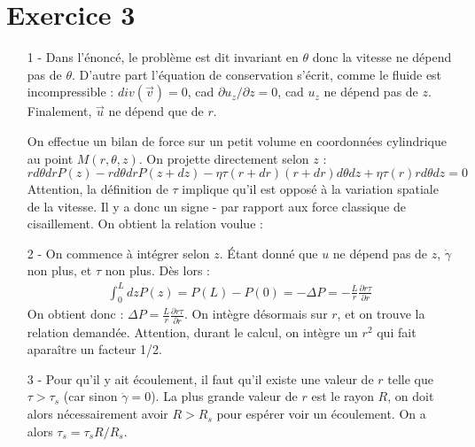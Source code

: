 \documentclass{report}
\begin{document}
\section*{Exercice 3}

\begin{itemize}
	\item[1 - ] Dans l'énoncé, le problème est dit invariant en $\theta$ donc la vitesse ne dépend pas de $\theta$. D'autre part l'équation de conservation s'écrit, comme le fluide est incompressible : $div(\vec{v})=0$, cad $\partial u_z/\partial z=0$, cad $u_z$ ne dépend pas de $z$. Finalement, $\vec{u}$ ne dépend que de $r$.
	
	On effectue un bilan de force sur un petit volume en coordonnées cylindrique au point $M(r,\theta,z)$. On projette directement selon $z$ :
	\begin{equation}
		rd\theta drP(z) - rd\theta drP(z+dz) - \eta\tau(r+dr)(r+dr)d\theta dz+ \eta\tau(r)rd\theta dz =0
	\end{equation}
Attention, la définition de $\tau$ implique qu'il est opposé à la variation spatiale de la vitesse. Il y a donc un signe - par rapport aux force classique de cisaillement. 
On obtient la relation voulue :

\noindent{}

	\item[2 -] On commence à intégrer selon $z$. Étant donné que $u$ ne dépend pas de $z$, $\dot{\gamma}$ non plus, et $\tau$ non plus. Dès lors :
	\begin{align*}
		\int_0^Ldz P(z) = P(L)-P(0)=-\Delta P =-\frac{L}{r}\frac{\partial r\tau}{\partial r}
	\end{align*}
	On obtient donc : $\Delta P =\frac{L}{r}\frac{\partial r\tau}{\partial r}$. On intègre désormais sur $r$, et on trouve la relation demandée. Attention, durant le calcul, on intègre un $r^2$ qui fait aparaître un facteur 1/2. 
	
	\item[3 - ] Pour qu'il y ait écoulement, il faut qu'il existe une valeur de $r$ telle que $\tau>\tau_s$ (car sinon $\dot{\gamma}=0$). La plus grande valeur de $r$ est le rayon $R$, on doit alors nécessairement avoir $R>R_s$ pour espérer voir un écoulement. On a alors $\tau_s = \tau_s R/R_s$.


\end{itemize}
\end{document}
